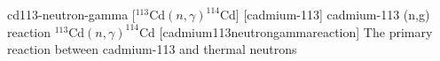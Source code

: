 \newglsXreaction%
{cd113-neutron-gamma}%
[{}$^{113}$Cd$(n,\gamma)^{114}$Cd]%
[cadmium-113]%
{cadmium-113 (n,g) reaction}%
{{}$^{113}$Cd$(n,\gamma)^{114}$Cd}%
[cadmium113neutrongammareaction]%
{The primary reaction between cadmium-113 and thermal neutrons}%